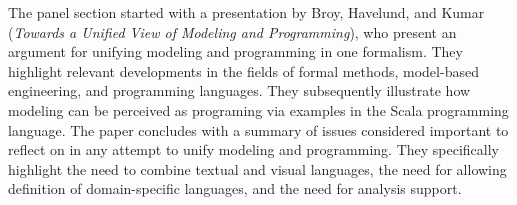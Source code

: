 


The panel section started with a presentation by
Broy, Havelund, and Kumar
\cite{isola-2016-broy}
({\em Towards a Unified View of Modeling and Programming}),
who present an argument for unifying modeling and programming in 
one formalism. They highlight relevant developments in the fields 
of formal methods, model-based engineering, and programming 
languages. They subsequently illustrate how modeling can be 
perceived as programing via examples in the Scala 
programming language. The paper concludes with a summary of
issues considered important to reflect on in any attempt to 
unify modeling and programming. They specifically highlight
the need to combine textual and visual languages, the need for
allowing definition of domain-specific languages, and the need for analysis support.

